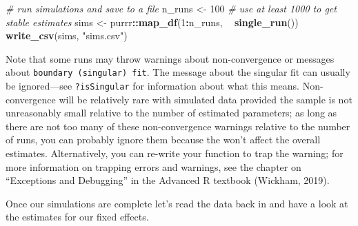 \documentclass[english,doc,floatsintext]{apa6}
\newenvironment{Shaded}{\begin{snugshade}}{\end{snugshade}}
\newcommand{\CommentTok}[1]{\textcolor[rgb]{0.56,0.35,0.01}{\textit{#1}}}
\newcommand{\DataTypeTok}[1]{\textcolor[rgb]{0.13,0.29,0.53}{#1}}
\newcommand{\DecValTok}[1]{\textcolor[rgb]{0.00,0.00,0.81}{#1}}
\newcommand{\KeywordTok}[1]{\textcolor[rgb]{0.13,0.29,0.53}{\textbf{#1}}}
\newcommand{\NormalTok}[1]{#1}
\newcommand{\OperatorTok}[1]{\textcolor[rgb]{0.81,0.36,0.00}{\textbf{#1}}}
\newcommand{\OtherTok}[1]{\textcolor[rgb]{0.56,0.35,0.01}{#1}}
\newcommand{\StringTok}[1]{\textcolor[rgb]{0.31,0.60,0.02}{#1}}
\begin{document}
\begin{Shaded}
\begin{Highlighting}[]
\CommentTok{# run simulations and save to a file}
\NormalTok{n_runs <-}\StringTok{ }\DecValTok{100} \CommentTok{# use at least 1000 to get stable estimates}
\NormalTok{sims <-}\StringTok{ }\NormalTok{purrr}\OperatorTok{::}\KeywordTok{map_df}\NormalTok{(}\DecValTok{1}\OperatorTok{:}\NormalTok{n_runs, }\OperatorTok{~}\StringTok{ }\KeywordTok{single_run}\NormalTok{())}
\KeywordTok{write_csv}\NormalTok{(sims, }\StringTok{"sims.csv"}\NormalTok{)}
\end{Highlighting}
\end{Shaded}

Note that some runs may throw warnings about non-convergence or messages about \texttt{boundary\ (singular)\ fit}. The message about the singular fit can usually be ignored---see \texttt{?isSingular} for information about what this means. Non-convergence will be relatively rare with simulated data provided the sample is not unreasonably small relative to the number of estimated parameters; as long as there are not too many of these non-convergence warnings relative to the number of runs, you can probably ignore them because the won't affect the overall estimates. Alternatively, you can re-write your function to trap the warning; for more information on trapping errors and warnings, see the chapter on \enquote{Exceptions and Debugging} in the Advanced R textbook (Wickham, 2019).

Once our simulations are complete let's read the data back in and have a look at the estimates for our fixed effects.

\begin{Shaded}
\end{Shaded}
\end{document}
